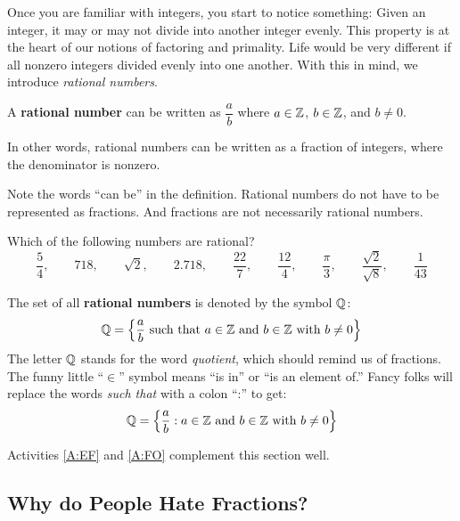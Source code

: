 Once you are familiar with integers, you start to notice something:
Given an integer, it may or may not divide into another integer
evenly. This property is at the heart of our notions of factoring and
primality. Life would be very different if all nonzero integers
divided evenly into one another. With this in mind, we introduce
\textit{rational numbers}.  

\begin{definition} 
A \textbf{rational number} can be written as $\dfrac{a}{b}$ where $a\in\mathbb Z$, $b\in\mathbb Z$, and $b\ne 0$.
\end{definition}

In other words, rational numbers can be written as a fraction of integers, where the denominator is nonzero.
\begin{warning}
Note the words ``can be'' in the definition.  Rational numbers do not have to be represented as fractions.  And fractions are not necessarily rational numbers.  
\end{warning}

\begin{question}
Which of the following numbers are rational?
$$\frac{5}{4}, \qquad 718, \qquad \sqrt{2}, \qquad 2.718, \qquad \frac{22}{7}, \qquad \frac{12}{4}, \qquad \frac{\pi}{3}, \qquad \frac{\sqrt{2}}{\sqrt{8}}, \qquad \frac{1}{43}$$
\end{question}

The set of all \textbf{rational numbers} is denoted by the symbol $\mathbb Q$: 
\[
      \Q = \left\{\frac{a}{b}\text{ such that $a\in\Z$ and $b\in\Z$ with $b\ne 0$}\right\}\index{Q@$\Q$}\index{e@$\in$}
\]
The letter $\mathbb Q$ stands for the word \textit{quotient}, which should remind us of
fractions.   The funny little ``$\in$'' symbol means ``is in'' or ``is an element of.'' Fancy folks will replace the words \textit{such that} with a colon
``:'' to get:
\[
 \mathbb Q = \left\{\frac{a}{b}:\text{$a\in\mathbb Z$ and $b\in\mathbb Z$ with $b\ne 0$}\right\}
\]

\begin{activitynote}
Activities \ref{A:EF} and \ref{A:FO} complement this section well.  
\end{activitynote}


\subsection{Why do People Hate Fractions?}


